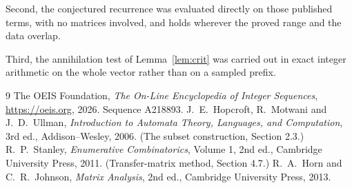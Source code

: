 \documentclass[11pt,a4paper]{article}
\theoremstyle{plain}
\theoremstyle{definition}
\begin{document}
Second, the conjectured recurrence was evaluated directly on those published terms, with no
matrices involved, and holds wherever the proved range and the data overlap.

Third, the annihilation test of Lemma~\ref{lem:crit} was carried out in exact integer
arithmetic on the whole vector rather than on a sampled prefix.

\begin{thebibliography}{9}
 The OEIS Foundation, \emph{The On-Line Encyclopedia of Integer
Sequences}, \url{https://oeis.org}, 2026. Sequence A218893.
 J.~E.~Hopcroft, R.~Motwani and J.~D.~Ullman, \emph{Introduction to Automata
Theory, Languages, and Computation}, 3rd ed., Addison--Wesley, 2006. (The subset
construction, Section 2.3.)
 R.~P.~Stanley, \emph{Enumerative Combinatorics}, Volume 1, 2nd ed.,
Cambridge University Press, 2011. (Transfer-matrix method, Section 4.7.)
 R.~A.~Horn and C.~R.~Johnson, \emph{Matrix Analysis}, 2nd ed., Cambridge
University Press, 2013.
\end{thebibliography}
\end{document}
